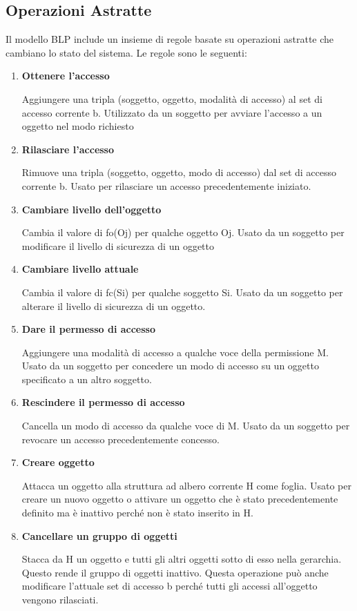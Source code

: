 \subsection{Operazioni Astratte}
Il modello BLP include un insieme di regole basate su operazioni astratte che cambiano lo stato del sistema. Le regole sono le seguenti:

\begin{enumerate}
    \item \textbf{Ottenere l'accesso}
    
    Aggiungere una tripla (soggetto, oggetto, modalità di accesso) al set di accesso corrente b. Utilizzato da un soggetto per avviare l'accesso a un oggetto nel modo richiesto

    \item \textbf{Rilasciare l'accesso}
    
    Rimuove una tripla (soggetto, oggetto, modo di accesso) dal set di accesso corrente b. Usato per rilasciare un accesso precedentemente iniziato.
    
    \item \textbf{Cambiare livello dell'oggetto}
    
    Cambia il valore di fo(Oj) per qualche oggetto Oj. Usato da un soggetto per modificare il livello di sicurezza di un oggetto
    
    \item \textbf{Cambiare livello attuale}
    
    Cambia il valore di fc(Si) per qualche soggetto Si. Usato da un soggetto per alterare il livello di sicurezza di un oggetto.
    
    \item \textbf{Dare il permesso di accesso}
    
    Aggiungere una modalità di accesso a qualche voce della permissione M. Usato da un soggetto per concedere un modo di accesso su un oggetto specificato a un altro soggetto.
    
    \item \textbf{Rescindere il permesso di accesso}
    
    Cancella un modo di accesso da qualche voce di M. Usato da un soggetto per revocare un accesso precedentemente concesso.
    
    \item \textbf{Creare oggetto}
    
    Attacca un oggetto alla struttura ad albero corrente H come foglia. Usato per creare un nuovo oggetto o attivare un oggetto che è stato precedentemente definito ma è inattivo perché non è stato inserito in H.
    
    \item \textbf{Cancellare un gruppo di oggetti}
    
    Stacca da H un oggetto e tutti gli altri oggetti sotto di esso nella gerarchia. Questo rende il gruppo di oggetti inattivo. Questa operazione può anche modificare l'attuale set di accesso b perché tutti gli accessi all'oggetto vengono rilasciati.
\end{enumerate}
